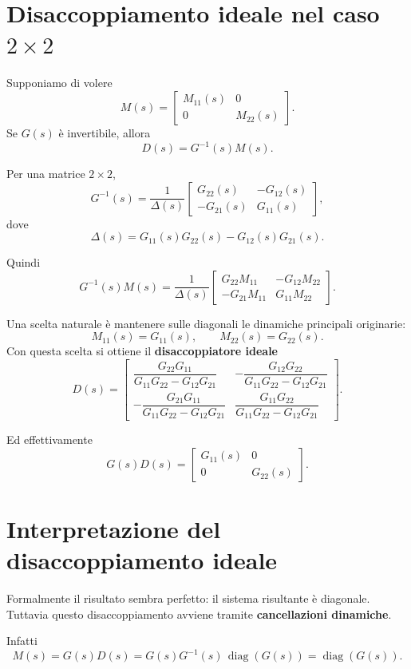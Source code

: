 \section{Disaccoppiamento ideale nel caso \(2\times 2\)}

Supponiamo di volere
\[
M(s)=
\begin{bmatrix}
M_{11}(s) & 0\\
0 & M_{22}(s)
\end{bmatrix}.
\]
Se \(G(s)\) è invertibile, allora
\[
D(s)=G^{-1}(s)M(s).
\]

Per una matrice \(2\times 2\),
\[
G^{-1}(s)=\frac{1}{\Delta(s)}
\begin{bmatrix}
G_{22}(s) & -G_{12}(s)\\
-G_{21}(s) & G_{11}(s)
\end{bmatrix},
\]
dove
\[
\Delta(s)=G_{11}(s)G_{22}(s)-G_{12}(s)G_{21}(s).
\]

Quindi
\[
G^{-1}(s)M(s)
=\frac{1}{\Delta(s)}
\begin{bmatrix}
G_{22}M_{11} & -G_{12}M_{22}\\
-G_{21}M_{11} & G_{11}M_{22}
\end{bmatrix}.
\]

Una scelta naturale è mantenere sulle diagonali le dinamiche principali originarie:
\[
M_{11}(s)=G_{11}(s),\qquad M_{22}(s)=G_{22}(s).
\]
Con questa scelta si ottiene il \textbf{disaccoppiatore ideale}
\[
\boxed{
D(s)=
\begin{bmatrix}
\dfrac{G_{22}G_{11}}{G_{11}G_{22}-G_{12}G_{21}}
&
-\dfrac{G_{12}G_{22}}{G_{11}G_{22}-G_{12}G_{21}}
\\[1.2em]
-\dfrac{G_{21}G_{11}}{G_{11}G_{22}-G_{12}G_{21}}
&
\dfrac{G_{11}G_{22}}{G_{11}G_{22}-G_{12}G_{21}}
\end{bmatrix}.
}
\]

Ed effettivamente
\[
G(s)D(s)=
\begin{bmatrix}
G_{11}(s) & 0\\
0 & G_{22}(s)
\end{bmatrix}.
\]

\section{Interpretazione del disaccoppiamento ideale}

Formalmente il risultato sembra perfetto: il sistema risultante è diagonale. Tuttavia questo disaccoppiamento avviene tramite \textbf{cancellazioni dinamiche}.

Infatti
\[
M(s)=G(s)D(s)=G(s)G^{-1}(s)\,\operatorname{diag}(G(s))
=\operatorname{diag}(G(s)).
\]


